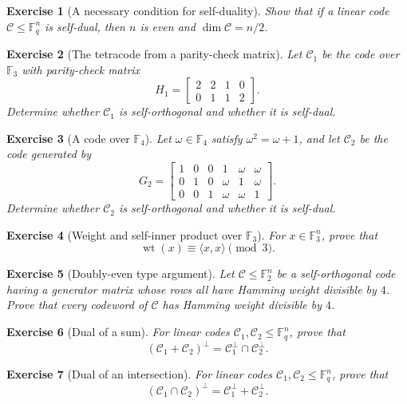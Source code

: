 \documentclass[11pt]{amsbook}
\theoremstyle{exstyle}
\newtheorem{exercise}{Exercise}
\theoremstyle{plain}
\newcommand{\F}{\mathbb{F}}
\newcommand{\Ccal}{\mathcal{C}}
\newcommand{\wt}{\operatorname{wt}}
\newcommand{\inner}[2]{\langle #1,#2\rangle}
\begin{document}
\begin{exercise}[A necessary condition for self-duality]
Show that if a linear code $\Ccal\leq \F_q^n$ is self-dual, then $n$ is even and $\dim \Ccal=n/2$.
\end{exercise}

\begin{exercise}[The tetracode from a parity-check matrix]
Let $\Ccal_1$ be the code over $\F_3$ with parity-check matrix
\[
H_1=
\begin{bmatrix}
2&2&1&0\\
0&1&1&2
\end{bmatrix}.
\]
Determine whether $\Ccal_1$ is self-orthogonal and whether it is self-dual.
\end{exercise}

\begin{exercise}[A code over $\F_4$]
Let $\omega\in \F_4$ satisfy $\omega^2=\omega+1$, and let $\Ccal_2$ be the code generated by
\[
G_2=
\begin{bmatrix}
1&0&0&1&\omega&\omega\\
0&1&0&\omega&1&\omega\\
0&0&1&\omega&\omega&1
\end{bmatrix}.
\]
Determine whether $\Ccal_2$ is self-orthogonal and whether it is self-dual.
\end{exercise}

\begin{exercise}[Weight and self-inner product over $\F_3$]
For $x\in \F_3^n$, prove that
\[
\wt(x)\equiv \inner{x}{x}\pmod 3.
\]
\end{exercise}

\begin{exercise}[Doubly-even type argument]
Let $\Ccal\leq\F_2^n$ be a self-orthogonal code having a generator matrix whose rows all have Hamming weight divisible by $4$. Prove that every codeword of $\Ccal$ has Hamming weight divisible by $4$.
\end{exercise}

\begin{exercise}[Dual of a sum]
For linear codes $\Ccal_1,\Ccal_2\leq\F_q^n$, prove that
\[
(\Ccal_1+\Ccal_2)^{\perp}=\Ccal_1^{\perp}\cap \Ccal_2^{\perp}.
\]
\end{exercise}

\begin{exercise}[Dual of an intersection]
For linear codes $\Ccal_1,\Ccal_2\leq\F_q^n$, prove that
\[
(\Ccal_1\cap \Ccal_2)^{\perp}=\Ccal_1^{\perp}+\Ccal_2^{\perp}.
\]
\end{exercise}
\end{document}
